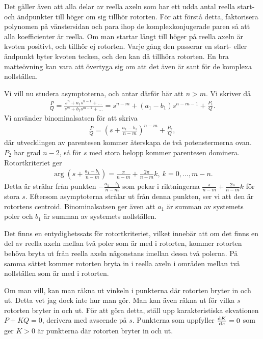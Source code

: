Det gäller även att alla delar av reella axeln som har ett udda antal reella start- och ändpunkter till höger om sig tillhör rotorten. För att förstå detta, faktorisera polynomen på vänstersidan och para ihop de komplexkonjugerade paren så att alla koefficienter är reella. Om man startar långt till höger på reella axeln är kvoten positivt, och tillhör ej rotorten. Varje gång den passerar en start- eller ändpunkt byter kvoten tecken, och den kan då tillhöra rotorten. En bra matteövning kan vara att övertyga sig om att det även är sant för de komplexa nollställen.

Vi vill nu studera asymptoterna, och antar därför här att $n > m$. Vi skriver då
\begin{align*}
	\frac{P}{Q} = \frac{s^{n} + a_{1}s^{n - 1} + \dots}{s^{m} + b_{1}s^{m - 1} + \dots} = s^{n - m} + (a_{1} - b_{1})s^{n  - m - 1} + \frac{P_{1}}{Q}.
\end{align*}
Vi använder binominalsatsen för att skriva
\begin{align*}
	\frac{P}{Q} = \left(s + \frac{a_{1} - b_{1}}{n - m}\right)^{n - m} + \frac{P_{2}}{Q},
\end{align*}
där utvecklingen av parentesen kommer återskapa de två potenstermerna ovan. $P_{2}$ har grad $n - 2$, så för $s$ med stora belopp kommer parentesen dominera. Rotortkriteriet ger
\begin{align*}
	\arg\left(s + \frac{a_{1} - b_{1}}{n - m}\right) = \frac{\pi}{n - m} + \frac{2\pi}{n - m}k,\ k = 0, \dots, m - n.
\end{align*}
Detta är strålar från punkten $-\frac{a_{1} - b_{1}}{n - m}$ som pekar i riktningerna $\frac{\pi}{n - m} + \frac{2\pi}{n - m}k$ för stora $s$. Eftersom asymptoterna strålar ut från denna punkten, ser vi att den är rotortens centroid. Binominalsatsen ger även att $a_{1}$ är summan av systemets poler och $b_{1}$ är summan av systemets nollställen.

Det finns en entydighetssats för rotortkriteriet, vilket innebär att om det finns en del av reella axeln mellan två poler som är med i rotorten, kommer rotorten behöva bryta ut från reella axeln någonstans imellan dessa två polerna. På samma sättet kommer rotorten bryta in i reella axeln i områden mellan två nollställen som är med i rotorten.

Om man vill, kan man räkna ut vinkeln i punkterna där rotorten bryter in och ut. Detta vet jag dock inte hur man gör. Man kan även räkna ut för vilka $s$ rotorten bryter in och ut. För att göra detta, ställ upp karakteristiska ekvationen $P + KQ = 0$, derivera med avseende på $s$. Punkterna som uppfyller $\dv{K}{s} = 0$ som ger $K > 0$ är punkterna där rotorten bryter in och ut.

